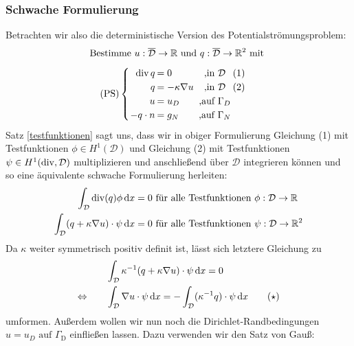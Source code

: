 \subsubsection{Schwache Formulierung}
Betrachten wir also die deterministische Version des Potentialströmungsproblem:
\[ \text{Bestimme } u:\overline{\mathcal{D}} \to \R \text{ und } q: \overline{\mathcal{D}} \to \R^2 \text{ mit } \newline \]
\[\setlength\arraycolsep{1pt}
\text{(PS)}\begin{cases} 
\begin{array}{rlcr}
\dive q     &= 0                 &\text{ ,} \text{in } \mathcal{D} &(1)\\
q           &= - \kappa \nabla u &\text{ ,} \text{in }\mathcal{D} &(2)\\
u           &= u_D               &\text{ ,} \text{auf } \Gamma_D \\
-q \cdot n  &= g_N               &\text{ ,} \text{auf } \Gamma_N 
\end{array}
\end{cases} 
\]
Satz \ref{testfunktionen} sagt uns, dass wir in obiger Formulierung Gleichung (1) mit Testfunktionen $\phi \in H^1(\mathcal{D})$ und Gleichung (2) mit Testfunktionen $\psi \in H^1(\operatorname{div},\mathcal{D})$ multiplizieren und anschließend über $\mathcal{D}$ integrieren können und so eine äquivalente schwache Formulierung herleiten:
\begin{align*}
	\int_{\mathcal{D}} \operatorname{div}(q) \phi \, \mathrm{d} x &= 0 \text{ für alle Testfunktionen } \phi : \mathcal{D} \to \mathbb{R} \\
	\int_{\mathcal{D}} (q + \kappa \nabla u) \cdot \psi \, \mathrm{d} x &= 0 \text{ für alle Testfunktionen } \psi : \mathcal{D} \to \mathbb{R}^2
\end{align*}
Da $\kappa$ weiter symmetrisch positiv definit ist, lässt sich letztere Gleichung zu 
\begin{align*}
	&\int_{\mathcal{D}} \kappa^{-1} (q + \kappa \nabla u) \cdot \psi \, \mathrm{d} x = 0 \\
	\Leftrightarrow \qquad &\int_{\mathcal{D}} \nabla u \cdot \psi \, \mathrm{d} x = - \int_{\mathcal{D}} (\kappa^{-1}q)\cdot \psi \, \mathrm{d} x \qquad (\star) 
\end{align*}
umformen. Außerdem wollen wir nun noch die Dirichlet-Randbedingungen $u = u_D \text{ auf } \Gamma_{\text{D}}$ einfließen lassen. Dazu verwenden wir den Satz von Gauß:


